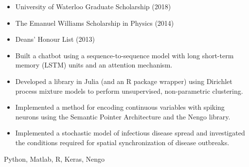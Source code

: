 \begin{itemize}
    \item University of Waterloo Graduate Scholarship (2018)
    \item The Emanuel Williams Scholarship in Physics (2014)
    \item Deans’ Honour List (2013)
\end{itemize}



\smallskip
\begin{itemize}
\item Built a chatbot using a sequence-to-sequence model with long short-term memory (LSTM) units and an attention mechanism. 
\end{itemize}
\smallskip

\divider

\smallskip
\begin{itemize}
\item Developed a library in Julia (and an R package wrapper) using Dirichlet process mixture models to perform unsupervised, non-parametric clustering.
\end{itemize}
\smallskip

\divider

\smallskip
\begin{itemize}
\item Implemented a method for encoding continuous variables with spiking neurons using the Semantic Pointer Architecture and the Nengo library. 
\end{itemize}

\divider

\smallskip
\begin{itemize}
\item Implemented a stochastic model of infectious disease spread and investigated the conditions required for spatial synchronization of disease outbreaks. 
\end{itemize}


Python, Matlab, R, Keras, Nengo

\cvproject{}